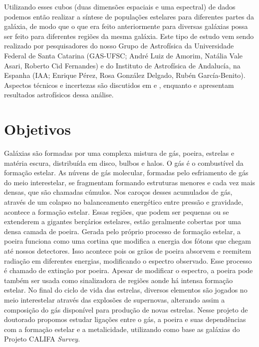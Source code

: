 \documentclass[a4paper,12pt]{article}
\begin{document}
Utilizando esses cubos (duas dimensões espaciais e uma espectral) de dados podemos então realizar a
síntese de populações estelares para diferentes partes da galáxia, de modo que o que era feito
anteriormente para diversas galáxias possa ser feito para diferentes regiões da mesma galáxia. Este
tipo de estudo vem sendo realizado por pesquisadores do nosso Grupo de Astrofísica da Universidade
Federal de Santa Catarina (GAS-UFSC; André Luiz de Amorim, Natália Vale Asari, Roberto Cid
Fernandes) e do Instituto de Astrofísica de Andalucía, na Espanha (IAA; Enrique Pérez, Rosa González
Delgado, Rubén García-Benito). Aspectos técnicos e incertezas são discutidos em
\citet{CidFernandes.etal.2013a} e \citet{CidFernandes.etal.2014a}, enquanto \citet{Perez.etal.2013a}
e \citet{GonzalezDelgado.etal.2014a} apresentam resultados astrofísicos dessa análise.

\section{Objetivos}
\vspace{0.3cm}

Galáxias são formadas por uma complexa mistura de gás, poeira, estrelas e matéria escura,
distribuída em disco, bulbos e halos. O gás é o combustível da formação estelar. As núvens de gás
molecular, formadas pelo esfriamento de gás do meio interestelar, se fragmentam formando estruturas
menores e cada vez mais densas, que são chamadas cúmulos. Nos caroços desses acumulados de gás,
através de um colapso no balanceamento energético entre pressão e gravidade, acontece a formação
estelar. Essas regiões, que podem ser pequenas ou se extenderem a gigantes berçários estelares,
estão geralmente cobertas por uma densa camada de poeira. Gerada pelo próprio processo de formação
estelar, a poeira funciona como uma cortina que modifica a energia dos fótons que chegam até nossos
detectores. Isso acontece pois os grãos de poeira absorvem e reemitem radiação em diferentes
energias, modificando o espectro observado. Esse processo é chamado de extinção por poeira. Apesar
de modificar o espectro, a poeira pode também ser usada como sinalizadora de regiões aonde há
intensa formação estelar. No final do ciclo de vida das estrelas, diversos elementos são jogados no
meio interestelar através das explosões de supernovas, alterando assim a composição do gás
disponível para produção de novas estrelas. Nesse projeto de doutorado propomos estudar ligações
entre o gás, a poeira e suas dependências com a formação estelar e a metalicidade, utilizando como
base as galáxias do Projeto CALIFA {\em Survey}.
\end{document}
